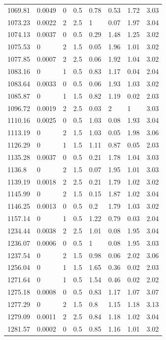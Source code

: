 \begin{longtable}[!h] {p{} p{} p{} p{} p{} p{} p{} p{}}
	1069.81	&	0.0049	&	0	&	0.5	&	0.78	&	0.53	&	1.72	&	3.03    \\
	1073.23	&	0.0022	&	2	&	2.5	&	1		&	0.07	&	1.97	&	3.04    \\
	1074.13	&	0.0037	&	0	&	0.5	&	0.29	&	1.48	&	1.25	&	3.02    \\
	1075.53	&	0		&	2	&	1.5	&	0.05	&	1.96	&	1.01	&	3.02    \\
	1077.85	&	0.0007	&	2	&	2.5	&	0.06	&	1.92	&	1.04	&	3.02    \\
	1083.16	&	0		&	1	&	0.5	&	0.83	&	1.17	&	0.04	&	2.04    \\
	1083.64	&	0.0033	&	0	&	0.5	&	0.06	&	1.93	&	1.03	&	3.02    \\
	1085.87	&	0		&	1	&	1.5	&	0.82	&	1.19	&	0.02	&	2.03    \\
	1096.72	&	0.0019	&	2	&	2.5	&	0.03	&	2		&	1		&	3.03    \\
	1110.16	&	0.0025	&	0	&	0.5	&	1.03	&	0.08	&	1.93	&	3.04    \\
	1113.19	&	0		&	2	&	1.5	&	1.03	&	0.05	&	1.98	&	3.06    \\
	1126.29	&	0		&	1	&	1.5	&	1.11	&	0.87	&	0.05	&	2.03    \\
	1135.28	&	0.0037	&	0	&	0.5	&	0.21	&	1.78	&	1.04	&	3.03    \\
	1136.8	&	0		&	2	&	1.5	&	0.07	&	1.95	&	1.01	&	3.03    \\
	1139.19	&	0.0018	&	2	&	2.5	&	0.21	&	1.79	&	1.02	&	3.02    \\
	1145.99	&	0		&	2	&	1.5	&	0.15	&	1.87	&	1.02	&	3.04    \\
	1146.25	&	0.0013	&	0	&	0.5	&	0.2		&	1.79	&	1.03	&	3.02    \\
	1157.14	&	0		&	1	&	0.5	&	1.22	&	0.79	&	0.03	&	2.04    \\
	1234.44	&	0.0038	&	2	&	2.5	&	1.01	&	0.08	&	1.95	&	3.04    \\
	1236.07	&	0.0006	&	0	&	0.5	&	1		&	0.08	&	1.95	&	3.03    \\
	1237.54	&	0		&	2	&	1.5	&	0.98	&	0.06	&	2.02	&	3.06    \\
	1256.04	&	0		&	1	&	1.5	&	1.65	&	0.36	&	0.02	&	2.03    \\
	1271.64	&	0		&	1	&	0.5	&	1.54	&	0.46	&	0.02	&	2.02    \\
	1275.18	&	0.0008	&	0	&	0.5	&	0.83	&	1.17	&	1.07	&	3.07    \\
	1277.29	&	0		&	2	&	1.5	&	0.8		&	1.15	&	1.18	&	3.13    \\
	1279.09	&	0.0011	&	2	&	2.5	&	0.84	&	1.18	&	1.02	&	3.04    \\
	1281.57	&	0.0002	&	0	&	0.5	&	0.85	&	1.16	&	1.01	&	3.02    \\

\end{longtable}
